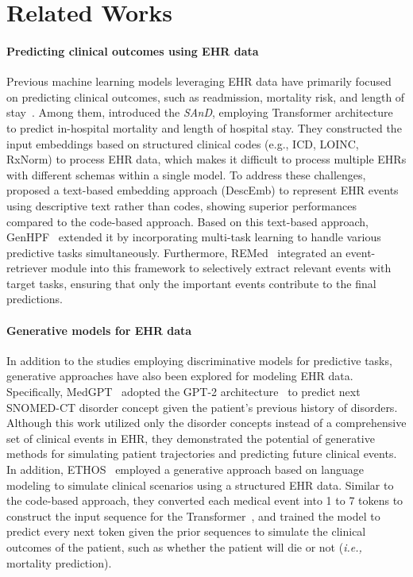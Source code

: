 \section{Related Works}
\paragraph{Predicting clinical outcomes using EHR data}
Previous machine learning models leveraging EHR data have primarily focused on predicting clinical outcomes, such as readmission, mortality risk, and length of stay~\citep{song2018attend, xiao2018readmission,hur2022unifying,hur2023genhpf,kim2023general,wornow2023ehrshot, renc2024zero}.
Among them, \citet{song2018attend} introduced the \textit{SAnD}, employing Transformer architecture~\citep{vaswani2017attention} to predict in-hospital mortality and length of hospital stay.
They constructed the input embeddings based on structured clinical codes (e.g., ICD, LOINC, RxNorm) to process EHR data, which makes it difficult to process multiple EHRs with different schemas within a single model.
To address these challenges, \citet{hur2022unifying} proposed a text-based embedding approach (DescEmb) to represent EHR events using descriptive text rather than codes, showing superior performances compared to the code-based approach.
Based on this text-based approach, GenHPF~\citep{hur2023genhpf} extended it by incorporating multi-task learning to handle various predictive tasks simultaneously.
Furthermore, REMed~\citep{kim2023general} integrated an event-retriever module into this framework to selectively extract relevant events with target tasks, ensuring that only the important events contribute to the final predictions.

\paragraph{Generative models for EHR data}
In addition to the studies employing discriminative models for predictive tasks, generative approaches have also been explored for modeling EHR data.
Specifically, MedGPT~\citep{kraljevic2021medgpt} adopted the GPT-2 architecture~\citep{radford2019language} to predict next SNOMED-CT disorder concept given the patient's previous history of disorders.
Although this work utilized only the disorder concepts instead of a comprehensive set of clinical events in EHR, they demonstrated the potential of generative methods for simulating patient trajectories and predicting future clinical events.
In addition, ETHOS~\citep{renc2024zero} employed a generative approach based on language modeling to simulate clinical scenarios using a structured EHR data.
Similar to the code-based approach, they converted each medical event into 1 to 7 tokens to construct the input sequence for the Transformer~\citep{vaswani2017attention}, and trained the model to predict every next token given the prior sequences to simulate the clinical outcomes of the patient, such as whether the patient will die or not (\textit{i.e.,} mortality prediction).

